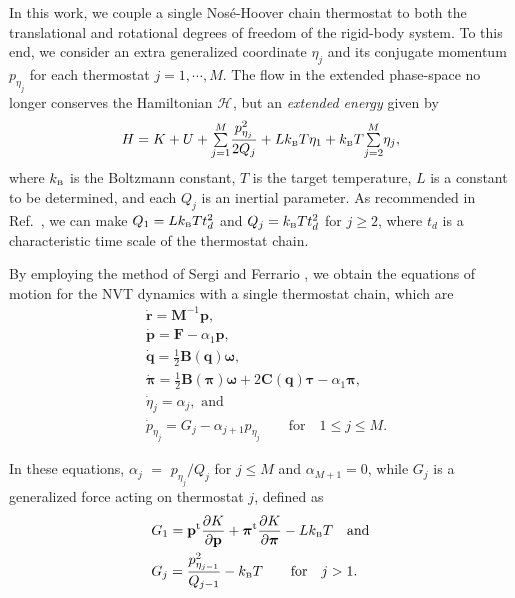 \documentclass[
journal=jctcce,
layout=twocolumn
]{achemso}
\newcommand{\mt}[1]{\boldsymbol{\mathbf{#1}}}   %
\newcommand{\vt}[1]{\boldsymbol{\mathbf{#1}}}   %
\newcommand{\tr}[1]{#1^\text{t}}                %
\newcommand{\diff}[2]{\frac{\partial #1}{\partial #2}} %
\newcommand{\Ham}[1]{{\mathcal H}_\text{#1}}    %
\begin{document}
In this work, we couple a single Nos\'{e}-Hoover chain thermostat \cite{Martyna_1992} to both the translational and rotational degrees of freedom of the rigid-body system.
To this end, we consider an extra generalized coordinate $\eta_j$ and its conjugate momentum $p_{\eta_j}$ for each thermostat $j = 1, \cdots, M$.
The flow in the extended phase-space no longer conserves the Hamiltonian $\Ham{}$, but an \textit{extended energy} given by \cite{Martyna_1992}
\begin{equation}
\label{eq:nvt extended energy}
H = K + U + {\textstyle\sum\limits_{j=1}^{M}} \frac{p_{\eta_j}^2}{2Q_j} + L k_\text{\tiny B} T\eta_1 + k_\text{\tiny B} T {\textstyle\sum\limits_{j=2}^{M}} \eta_j,
\end{equation}
where $k_\text{\tiny B}$ is the Boltzmann constant, $T$ is the target temperature, $L$ is a constant to be determined, and each $Q_j$ is an inertial parameter.
As recommended in Ref.~, we can make $Q_1 = L k_\text{\tiny B} T t_d^2$ and $Q_j = k_\text{\tiny B} T t_d^2$ for $j \geq 2$, where $t_d$ is a characteristic time scale of the thermostat chain.

By employing the method of Sergi and Ferrario \cite{Sergi_2001}, we obtain the equations of motion for the NVT dynamics with a single thermostat chain, which are
\begin{subequations}
	\label{eq:ODE system for NVT}
	\begin{align}
\label{eq:nhc_r}
	&\dot{\vt r} =
	{\mt M}^{-1} {\vt p}, \\
%
\label{eq:nhc_p} 
	&\dot{\vt p} =
	{\vt F} - \alpha_1 {\vt p},\\
%
\label{eq:nhc_q}
	&\dot{\vt q} =
	\frac{1}{2} \mt B(\vt q) \vt \omega, \\
%
\label{eq:nhc_pi}
	&\dot{\vt \pi} =
	\frac{1}{2} \mt B(\vt \pi) \vt \omega + 2 \mt C(\vt q) \vt \tau - \alpha_1 {\vt \pi}, \\
%
\label{eq:nhc_eta}
	&\dot{\eta}_j = \alpha_j, \text{ and} \\
%
\label{eq:nhc_p_eta}
	&{\dot p}_{\eta_j} = G_j - \alpha_{j+1} p_{\eta_j} \qquad \text{for} \quad 1 \leq j \le M.
	\end{align}
\end{subequations}

In these equations, $\alpha_j$ $=$ ${p_{\eta_j}}/{Q_j}$ for $j \le M$ and $\alpha_{M+1} = 0$, while $G_j$ is a generalized force acting on thermostat $j$, defined as
\begin{subequations}
\begin{align}
\label{eq:generalized force NVT}
&G_1 = \tr{\vt p} \diff{K}{\vt p} + \tr{\vt \pi} \diff{K}{\vt \pi} - L k_\text{\tiny B} T \quad \text{and}\\
&G_j = \frac{p_{\eta_{j-1}}^2}{Q_{j-1}} - k_\text{\tiny B} T  \qquad \text{for} \quad j > 1.
\end{align}
\end{subequations}
\end{document}
